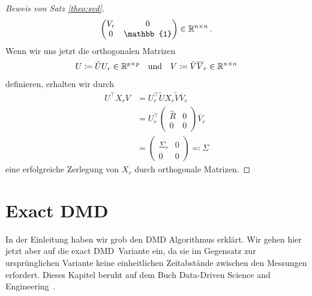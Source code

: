 \documentclass[../Bachelor_LennartKoliwer.tex]{subfiles}
\begin{document}
\begin{proof}[Beweis von Satz \ref{theo:svd}]
\begin{align*}
\begin{pmatrix}
			          V_r & 0          \\
			          0   & \mathbb{1}
		          \end{pmatrix} \in \RR^{n\times n}\,.
	\end{align*}
	Wenn wir uns jetzt die orthogonalen Matrizen
	\begin{align*}
		U \coloneqq \tilde{U}U_r\in \mathbb{R}^{p\times p}
		\quad\text{und}\quad
		V \coloneqq \tilde{V}\overline{V}_r\in \mathbb{R}^{n\times n}
	\end{align*}
	definieren, erhalten wir durch
	\begin{align*}
		U^\top X_r V & = U_r^\top\tilde{U}X_r\tilde{V}\overline{V}_r \\
		             & =U_r^\top\begin{pmatrix}
			                        \hat{R} & 0 \\
			                        0       & 0
		                        \end{pmatrix}\overline{V}_r          \\
		             & =\begin{pmatrix}
			                \hat{\Sigma}_r & 0 \\
			                0              & 0
		                \end{pmatrix} \eqqcolon \Sigma
	\end{align*}
	eine erfolgreiche Zerlegung von $X_r$ durch orthogonale Matrizen.
\end{proof}



 
\section{Exact DMD}\label{chap:exactDMD}

In der Einleitung haben wir grob den DMD Algorithmus erklärt.
Wir gehen hier jetzt aber auf die \glqq exact DMD\grqq\ Variante ein, da sie im Gegensatz zur ursprünglichen Variante keine einheitlichen Zeitabstände zwischen den Messungen erfordert.
Dieses Kapitel beruht auf dem Buch \glqq Data-Driven Science and Engineering\grqq\ \cite{SlaySlaySlay}.
\end{document}
